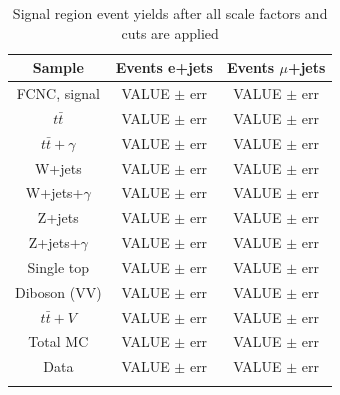 \begin{table}[h!]
\begin{center}
{\renewcommand{\arraystretch}{1.2}
\begin{tabular}{ccc}
\hhline{===}
Sample  &  Events e+jets   & Events $\mu$+jets   \\  \hline 
FCNC, signal			& VALUE $\pm$ err & VALUE $\pm$ err\\
$t\bar{t}$            		& VALUE $\pm$ err & VALUE $\pm$ err\\
$t\bar{t}+\gamma$           & VALUE $\pm$ err & VALUE $\pm$ err\\
W+jets			& VALUE $\pm$ err & VALUE $\pm$ err\\   
W+jets+$\gamma$		& VALUE $\pm$ err & VALUE $\pm$ err\\
Z+jets	            	& VALUE $\pm$ err & VALUE $\pm$ err\\
Z+jets+$\gamma$		& VALUE $\pm$ err & VALUE $\pm$ err\\
Single top 		           & VALUE $\pm$ err & VALUE $\pm$ err\\
Diboson (VV)		          	& VALUE $\pm$ err & VALUE $\pm$ err\\
$t\bar{t}+V$	           & VALUE $\pm$ err & VALUE $\pm$ err\\ \hline
Total MC 			& VALUE $\pm$ err & VALUE $\pm$ err\\ \hline
Data		                     	& VALUE $\pm$ err & VALUE $\pm$ err\\ \hhline{===}
\end{tabular}
\caption{Signal region event yields after all scale factors and cuts are applied }
\label{tab:SRYields}
}
\end{center}
\end{table}








